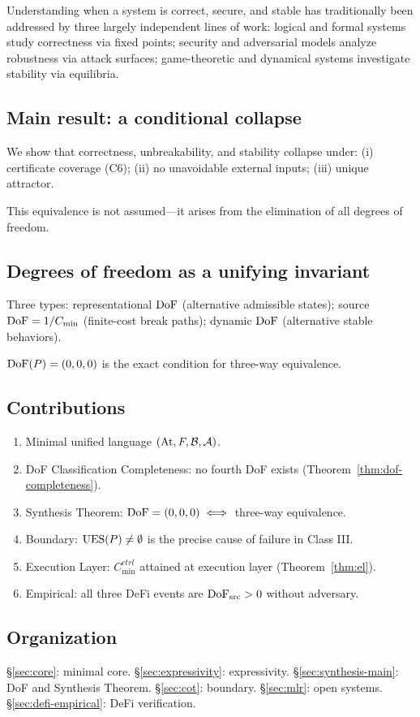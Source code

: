 Understanding when a system is correct, secure, and stable has
traditionally been addressed by three largely independent lines of work:
logical and formal systems study correctness via fixed points;
security and adversarial models analyze robustness via attack surfaces;
game-theoretic and dynamical systems investigate stability via equilibria.

\subsection{Main result: a conditional collapse}

We show that correctness, unbreakability, and stability collapse under:
(i) certificate coverage (C6); (ii) no unavoidable external inputs; (iii) unique attractor.

This equivalence is not assumed---it arises from the elimination of all degrees of freedom.

\subsection{Degrees of freedom as a unifying invariant}

Three types: representational $\mathrm{DoF}$ (alternative admissible states);
source $\mathrm{DoF} = 1/C_{\min}$ (finite-cost break paths);
dynamic $\mathrm{DoF}$ (alternative stable behaviors).

$\mathrm{DoF}(P)=(0,0,0)$ is the exact condition for three-way equivalence.

\subsection{Contributions}

\begin{enumerate}[label=(\arabic*)]
  \item Minimal unified language $(\mathrm{At},F,\mathcal{B},\mathcal{A})$.
  \item DoF Classification Completeness: no fourth DoF exists (Theorem~\ref{thm:dof-completeness}).
  \item Synthesis Theorem: $\mathrm{DoF}=(0,0,0) \iff$ three-way equivalence.
  \item Boundary: $\mathrm{UES}(P)\neq\emptyset$ is the precise cause of failure in Class III.
  \item Execution Layer: $C_{\min}^{ctrl}$ attained at execution layer (Theorem~\ref{thm:el}).
  \item Empirical: all three DeFi events are $\mathrm{DoF}_{\mathrm{src}}>0$ without adversary.
\end{enumerate}

\subsection{Organization}

\S\ref{sec:core}: minimal core. \S\ref{sec:expressivity}: expressivity.
\S\ref{sec:synthesis-main}: DoF and Synthesis Theorem.
\S\ref{sec:cot}: boundary. \S\ref{sec:mlr}: open systems.
\S\ref{sec:defi-empirical}: DeFi verification.
